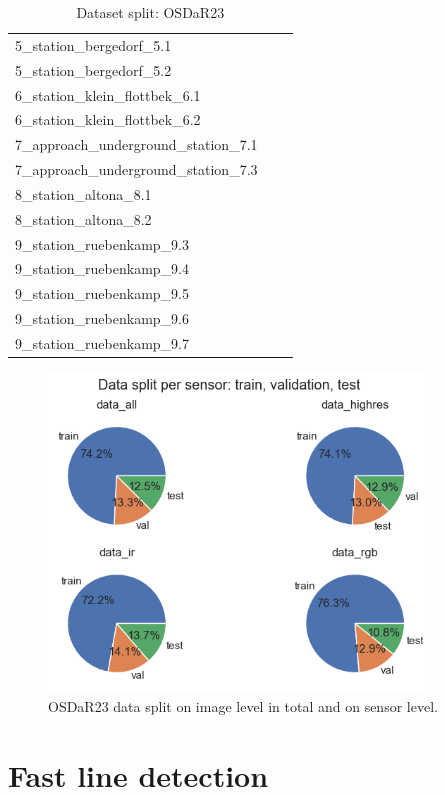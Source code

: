\documentclass[Master,MDS,english]{BASE/twbook} %
\begin{document}
\begin{table}[ht]
\begin{tabular}{|l|l|l|}
5\_station\_bergedorf\_5.1 & & \\
5\_station\_bergedorf\_5.2 & & \\
6\_station\_klein\_flottbek\_6.1 & & \\
6\_station\_klein\_flottbek\_6.2 & & \\
7\_approach\_underground\_station\_7.1 & & \\
7\_approach\_underground\_station\_7.3 & & \\
8\_station\_altona\_8.1 & & \\
8\_station\_altona\_8.2 & & \\
9\_station\_ruebenkamp\_9.3 & & \\
9\_station\_ruebenkamp\_9.4 & & \\
9\_station\_ruebenkamp\_9.5 & & \\
9\_station\_ruebenkamp\_9.6 & & \\
9\_station\_ruebenkamp\_9.7 & & \\
\hline
\end{tabular}
\caption{Dataset split: OSDaR23 }
\label{tab:dataset_split}
\end{table}



\begin{figure}[h]
\centering
\includegraphics[width=0.9\textwidth]{images/datasets/db/data_split}
\caption{OSDaR23 data split on image level in total and on sensor level. }
\label{fig:data_split}
\end{figure}

\section{Fast line detection}  \label{app:fld}
\end{document}
